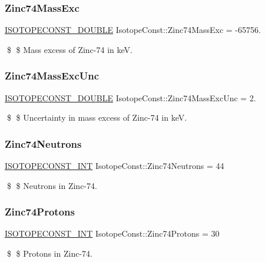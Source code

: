 \subsubsection{\texorpdfstring{Zinc74\+Mass\+Exc}{Zinc74MassExc}}
{\footnotesize\ttfamily \mbox{\hyperlink{group___isotope_const-_macros_ga8f45a7272ce02c0b4c65c44636ed719a}{I\+S\+O\+T\+O\+P\+E\+C\+O\+N\+S\+T\+\_\+\+D\+O\+U\+B\+LE}} Isotope\+Const\+::\+Zinc74\+Mass\+Exc = -\/65756.}

\$ \$ Mass excess of Zinc-\/74 in keV. \mbox{\label{group___isotope_const-_zinc-_zn74_ga7d47c4dd5d86783e9f71c1973cc8db81}} 
\subsubsection{\texorpdfstring{Zinc74\+Mass\+Exc\+Unc}{Zinc74MassExcUnc}}
{\footnotesize\ttfamily \mbox{\hyperlink{group___isotope_const-_macros_ga8f45a7272ce02c0b4c65c44636ed719a}{I\+S\+O\+T\+O\+P\+E\+C\+O\+N\+S\+T\+\_\+\+D\+O\+U\+B\+LE}} Isotope\+Const\+::\+Zinc74\+Mass\+Exc\+Unc = 2.}

\$ \$ Uncertainty in mass excess of Zinc-\/74 in keV. \mbox{\label{group___isotope_const-_zinc-_zn74_ga9690665eadc9a0b6b210cf5584726fda}} 
\subsubsection{\texorpdfstring{Zinc74\+Neutrons}{Zinc74Neutrons}}
{\footnotesize\ttfamily \mbox{\hyperlink{group___isotope_const-_macros_ga5f18360b3e99483a35c32d789e62621c}{I\+S\+O\+T\+O\+P\+E\+C\+O\+N\+S\+T\+\_\+\+I\+NT}} Isotope\+Const\+::\+Zinc74\+Neutrons = 44}

\$ \$ Neutrons in Zinc-\/74. \mbox{\label{group___isotope_const-_zinc-_zn74_ga0c185e2e3de921c9a9a48c27547aaaf5}} 
\subsubsection{\texorpdfstring{Zinc74\+Protons}{Zinc74Protons}}
{\footnotesize\ttfamily \mbox{\hyperlink{group___isotope_const-_macros_ga5f18360b3e99483a35c32d789e62621c}{I\+S\+O\+T\+O\+P\+E\+C\+O\+N\+S\+T\+\_\+\+I\+NT}} Isotope\+Const\+::\+Zinc74\+Protons = 30}

\$ \$ Protons in Zinc-\/74. 